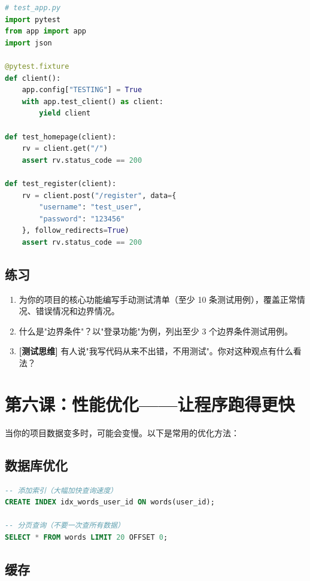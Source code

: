 \documentclass[a4paper,12pt]{ctexart}
\begin{document}
\begin{lstlisting}[language=Python]
# test_app.py
import pytest
from app import app
import json

@pytest.fixture
def client():
    app.config["TESTING"] = True
    with app.test_client() as client:
        yield client

def test_homepage(client):
    rv = client.get("/")
    assert rv.status_code == 200

def test_register(client):
    rv = client.post("/register", data={
        "username": "test_user",
        "password": "123456"
    }, follow_redirects=True)
    assert rv.status_code == 200
\end{lstlisting}

\subsection*{练习}

\begin{enumerate}
  \item 为你的项目的核心功能编写手动测试清单（至少 10 条测试用例），覆盖正常情况、错误情况和边界情况。
  \item 什么是"边界条件"？以"登录功能"为例，列出至少 3 个边界条件测试用例。
  \item \textbf{[测试思维]} 有人说"我写代码从来不出错，不用测试"。你对这种观点有什么看法？
\end{enumerate}

\section*{第六课：性能优化——让程序跑得更快}

当你的项目数据变多时，可能会变慢。以下是常用的优化方法：

\subsection*{数据库优化}

\begin{lstlisting}[language=SQL]
-- 添加索引（大幅加快查询速度）
CREATE INDEX idx_words_user_id ON words(user_id);

-- 分页查询（不要一次查所有数据）
SELECT * FROM words LIMIT 20 OFFSET 0;
\end{lstlisting}

\subsection*{缓存}
\end{document}
